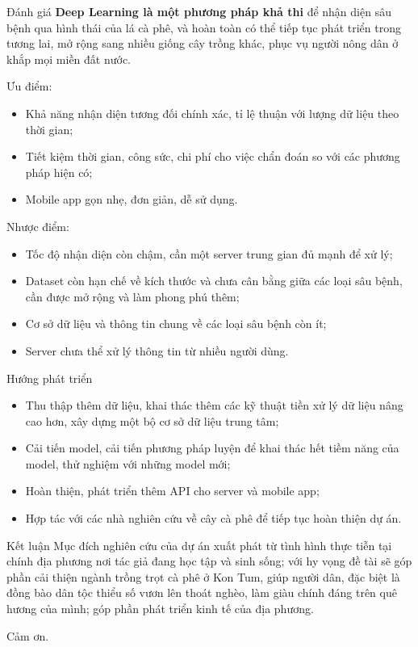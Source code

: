 \documentclass{beamer}
\begin{document}
\begin{frame}[allowframebreaks]{Đánh giá}
	\textbf{Deep Learning là một phương pháp khả thi} để nhận diện sâu bệnh qua hình thái của lá cà phê, và hoàn toàn có thể tiếp tục phát triển trong tương lai, mở rộng sang nhiều giống cây trồng khác, phục vụ người nông dân ở khắp mọi miền đất nước.

	\framebreak

	Ưu điểm:
	\begin{itemize}
		\item Khả năng nhận diện tương đối chính xác, tỉ lệ thuận với lượng dữ liệu theo thời gian;
		\item Tiết kiệm thời gian, công sức, chi phí cho việc chẩn đoán so với các phương pháp hiện có;
		\item Mobile app gọn nhẹ, đơn giản, dễ sử dụng.
	\end{itemize}

	\framebreak

	Nhược điểm:
	\begin{itemize}
		\item Tốc độ nhận diện còn chậm, cần một server trung gian đủ mạnh để xử lý;
		\item Dataset còn hạn chế về kích thước và chưa cân bằng giữa các loại sâu bệnh, cần được mở rộng và làm phong phú thêm;
		\item Cơ sở dữ liệu và thông tin chung về các loại sâu bệnh còn ít;
		\item Server chưa thể xử lý thông tin từ nhiều người dùng.
	\end{itemize}

	\framebreak

	Hướng phát triển
	\begin{itemize}
		\item Thu thập thêm dữ liệu, khai thác thêm các kỹ thuật tiền xử lý dữ liệu nâng cao hơn, xây dựng một bộ cơ sở dữ liệu trung tâm;
		\item Cải tiến model, cải tiến phương pháp luyện để khai thác hết tiềm năng của model, thử nghiệm với những model mới;
		\item Hoàn thiện, phát triển thêm API cho server và mobile app;
		\item Hợp tác với các nhà nghiên cứu về cây cà phê để tiếp tục hoàn thiện dự án.
	\end{itemize}

\end{frame}

\begin{frame}{Kết luận}
	Mục đích nghiên cứu của dự án xuất phát từ tình hình thực tiễn tại chính địa phương nơi tác giả đang học tập và sinh sống; với hy vọng đề tài sẽ góp phần cải thiện ngành trồng trọt cà phê ở Kon Tum, giúp người dân, đặc biệt là đồng bào dân tộc thiểu số vươn lên thoát nghèo, làm giàu chính đáng trên quê hương của mình; góp phần phát triển kinh tế của địa phương.
\end{frame}

\begin{frame}
	\centering \Large
	Cảm ơn.
\end{frame}
\end{document}
